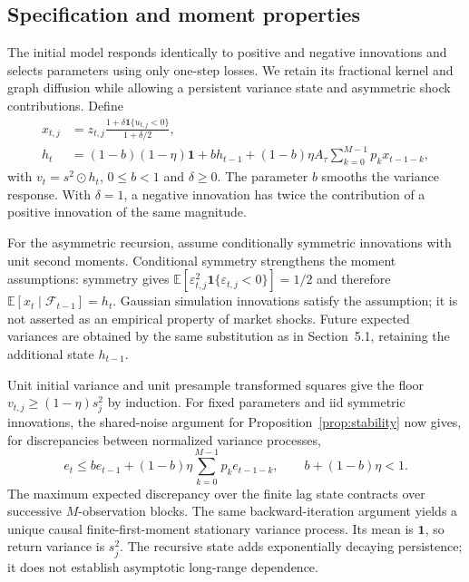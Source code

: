 \documentclass[12pt,a4paper]{article}
\newcommand{\E}{\mathbb E}
\newcommand{\one}{\mathbf 1}
\newcommand{\F}{\mathcal F}
\begin{document}
\subsection{Specification and moment properties}
The initial model responds identically to positive and negative innovations and
selects parameters using only one-step losses. We retain its fractional kernel
and graph diffusion while allowing a persistent variance state and asymmetric
shock contributions. Define
\begin{align}
x_{t,j}&=z_{t,j}\frac{1+\delta\mathbf1\{u_{t,j}<0\}}{1+\delta/2},\\
h_t&=(1-b)(1-\eta)\one+b h_{t-1}
 +(1-b)\eta A_\tau\sum_{k=0}^{M-1}p_k x_{t-1-k},
\label{eq:refined}
\end{align}
with $v_t=s^2\odot h_t$, $0\le b<1$ and $\delta\ge0$. The parameter $b$
smooths the variance response. With $\delta=1$, a negative innovation has twice
the contribution of a positive innovation of the same magnitude.

For the asymmetric recursion, assume conditionally symmetric innovations with
unit second moments. Conditional symmetry strengthens the moment assumptions:
symmetry gives $\E[\varepsilon_{t,j}^2\mathbf1\{\varepsilon_{t,j}<0\}]=1/2$
and therefore $\E[x_t\mid\F_{t-1}]=h_t$. Gaussian simulation innovations satisfy
the assumption; it is not asserted as an empirical property of market shocks.
Future expected variances are obtained by the same substitution as in
Section~5.1, retaining the additional state $h_{t-1}$.

Unit initial variance and unit presample transformed squares give the floor
$v_{t,j}\ge(1-\eta)s_j^2$ by induction. For fixed parameters and iid symmetric
innovations, the shared-noise argument for Proposition~\ref{prop:stability}
now gives, for discrepancies between normalized variance processes,
\begin{equation}
e_t\le b e_{t-1}+(1-b)\eta\sum_{k=0}^{M-1}p_k e_{t-1-k},\qquad
b+(1-b)\eta<1.
\end{equation}
The maximum expected discrepancy over the finite lag state contracts over
successive $M$-observation blocks. The same backward-iteration argument yields
a unique causal finite-first-moment stationary variance process. Its mean is
$\one$, so return variance is $s_j^2$. The recursive state adds exponentially
decaying persistence; it does not establish asymptotic long-range dependence.
\end{document}
